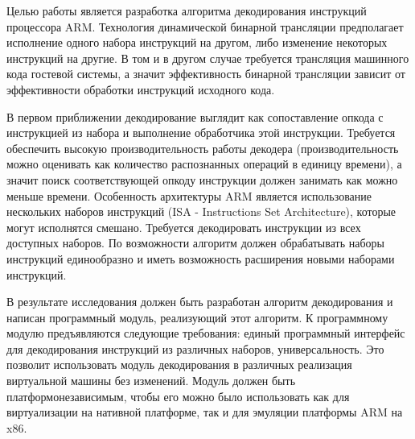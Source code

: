 
Целью работы является разработка алгоритма декодирования инструкций процессора ARM. Технология динамической бинарной трансляции предполагает исполнение одного набора инструкций на другом, либо изменение некоторых инструкций на другие. В том и в другом случае требуется трансляция машинного кода гостевой системы, а значит эффективность бинарной трансляции зависит от эффективности обработки инструкций исходного кода.

В первом приближении декодирование выглядит как сопоставление опкода с инструкцией из набора и выполнение обработчика этой инструкции. Требуется обеспечить высокую производительность работы декодера (производительность можно оценивать как количество распознанных операций в единицу времени), а значит поиск соответствующей опкоду инструкции должен занимать как можно меньше времени. Особенность архитектуры ARM является использование нескольких наборов инструкций (ISA - Instructions Set Architecture), которые могут исполнятся смешано. Требуется декодировать инструкции из всех доступных наборов. По возможности алгоритм должен обрабатывать наборы инструкций единообразно и иметь возможность расширения новыми наборами инструкций.

В результате исследования должен быть разработан алгоритм декодирования и написан программный модуль, реализующий этот алгоритм. К программному модулю предъявляются следующие требования: единый программный интерфейс для декодирования инструкций из различных наборов, универсальность. Это позволит использовать модуль декодирования в различных реализация виртуальной машины без изменений. Модуль должен быть платформонезависимым, чтобы его можно было использовать как для виртуализации на нативной платформе, так и для эмуляции платформы ARM на x86.





